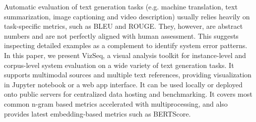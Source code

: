 Automatic evaluation of text generation tasks (e.g. machine translation, text summarization, image captioning and video description) usually relies heavily on 
task-specific metrics, such as BLEU and ROUGE. They, however, are abstract numbers and are not perfectly aligned with human assessment. This suggests inspecting detailed examples as a complement to identify system error patterns. In this paper, we present VizSeq, a visual analysis toolkit for instance-level and corpus-level system evaluation on a wide variety of text generation tasks. It supports multimodal sources and multiple text references, providing visualization in Jupyter notebook or a web app interface. It can be used locally or deployed onto public servers for centralized data hosting and benchmarking. It covers most common n-gram based metrics accelerated with multiprocessing, and also provides latest embedding-based metrics such as BERTScore.
